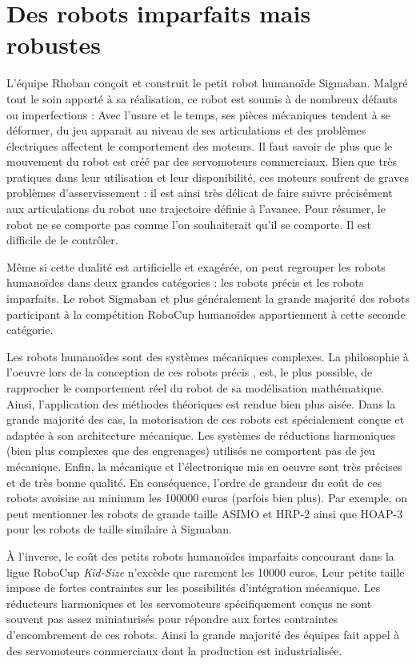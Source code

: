 \section{Des robots imparfaits mais robustes}

L'équipe Rhoban conçoit et construit le petit robot humanoïde
Sigmaban. Malgré tout le soin apporté à sa réalisation, ce robot
est soumis à de nombreux défauts ou imperfections :
Avec l'usure et le temps, ses pièces mécaniques tendent 
à se déformer, du jeu apparait au niveau de ses articulations
et des problèmes électriques affectent le comportement des moteurs.
Il faut savoir de plus que le mouvement du robot est créé par 
des servomoteurs commerciaux.
Bien que très pratiques dans leur utilisation et leur disponibilité, 
ces moteurs soufrent de graves problèmes d'asservissement : 
il est ainsi très délicat de faire suivre précisément aux articulations
du robot une trajectoire définie à l'avance.
Pour résumer, le robot ne se comporte pas comme l'on souhaiterait qu'il
se comporte. Il est difficile de le contrôler.

Même si cette dualité est artificielle et exagérée,
on peut regrouper les robots humanoïdes dans deux grandes catégories :
les robots \og précis \fg et les robots imparfaits.
Le robot Sigmaban et plus généralement la grande majorité des robots participant à
la compétition RoboCup humanoïdes appartiennent à cette seconde catégorie.

Les robots humanoïdes sont des systèmes mécaniques complexes.
La philosophie à l'oeuvre lors de la conception de ces robots \og précis \fg,
est, le plus possible, de rapprocher le comportement réel du robot
de sa modélisation mathématique.
Ainsi, l'application des méthodes théoriques est rendue bien plus aisée.
Dans la grande majorité des cas, la motorisation de ces robots est
spécialement conçue et adaptée à son architecture mécanique.
Les systèmes de réductions harmoniques (bien plus complexes que des engrenages) 
utilisés ne comportent pas de jeu mécanique.
Enfin, la mécanique et l'électronique mis en oeuvre sont très précises
et de très bonne qualité.
En conséquence, l'ordre de grandeur du coût de ces robots avoisine 
au minimum les 100000 euros (parfois bien plus).
Par exemple, on peut mentionner les robots de grande taille ASIMO et HRP-2 
ainsi que HOAP-3 pour les robots de taille similaire à Sigmaban.

À l'inverse, le coût des petits robots humanoïdes \og imparfaits \fg 
concourant dans la ligue RoboCup \textit{Kid-Size} n'excède 
que rarement les 10000 euros.
Leur petite taille impose de fortes contraintes sur
les possibilités d'intégration mécanique.
Les réducteurs harmoniques et les servomoteurs spécifiquement conçus
ne sont souvent pas assez miniaturisés pour répondre aux fortes 
contraintes d'encombrement de ces robots.
Ainsi la grande majorité des équipes fait appel à des servomoteurs
commerciaux dont la production est industrialisée.

